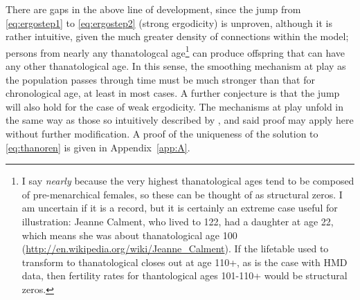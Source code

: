 \documentclass{article}
\begin{document}
There are gaps in the above line of development, since the jump from
\eqref{eq:ergostep1} to \eqref{eq:ergostep2} (strong ergodicity) is unproven,
although it is rather intuitive, given the much greater density of connections
within the model; persons from nearly any thanatologcal age\footnote{I say
\textit{nearly} because the very highest thanatological ages tend to be
composed of pre-menarchical females, so these can be thought of as structural
zeros. I am uncertain if it is a record, but it is certainly an extreme case
useful for illustration: Jeanne Calment, who lived to 122, had a daughter at age
22, which means she was about thanatological age 100
(\url{http://en.wikipedia.org/wiki/Jeanne_Calment}). If the lifetable used to
transform to thanatological closes out at age 110+, as is the case with HMD data, then fertility rates for thantological ages 101-110+ would be structural
zeros.} can produce offspring that can have any other thanatological age. In
this sense, the smoothing mechanism at play as the population passes through
time must be much stronger than that for chronological age, at least in most
cases. A further conjecture is that the jump will also hold for the case of weak ergodicity. The mechanisms at play unfold in the same way as those so intuitively described by \citet{arthur1982ergodic}, and said proof may apply here without further modification. A proof of the uniqueness of the solution to \eqref{eq:thanoren} is given in Appendix~\ref{app:A}.
\end{document}
